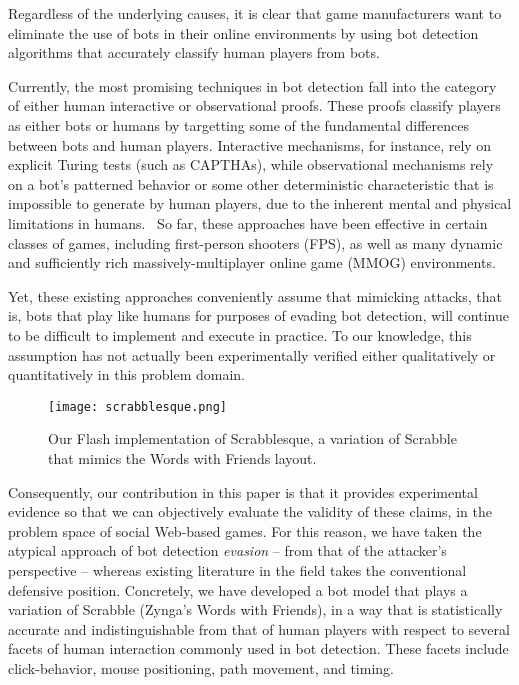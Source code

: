 \documentclass{acm_proc_article-sp}
\begin{document}
Regardless of the underlying causes, it is clear that game manufacturers want to eliminate the use of bots in their online environments by using bot detection algorithms that accurately classify human players from bots.

Currently, the most promising techniques in bot detection fall into the category of either human interactive or observational proofs. These proofs classify players as either bots or humans by targetting some of the fundamental differences between bots and human players. Interactive mechanisms, for instance, rely on explicit Turing tests (such as CAPTHAs), while observational mechanisms rely on a bot's patterned behavior or some other deterministic characteristic that is impossible to generate by human players, due to the inherent mental and physical limitations in humans.~\cite{preventbotitem} So far, these approaches have been effective in certain classes of games, including first-person shooters (FPS), as well as many dynamic and sufficiently rich massively-multiplayer online game (MMOG) environments.

Yet, these existing approaches conveniently assume that mimicking attacks, that is, bots that play like humans for purposes of evading bot detection, will continue to be difficult to implement and execute in practice. To our knowledge, this assumption has not actually been experimentally verified either qualitatively or quantitatively in this problem domain.

\begin{figure}
\centering
\texttt{[image: scrabblesque.png]}
\caption{Our Flash implementation of Scrabblesque, a variation of Scrabble that mimics the Words with Friends layout.}
\end{figure}

Consequently, our contribution in this paper is that it provides experimental evidence so that we can objectively evaluate the validity of these claims, in the problem space of social Web-based games. For this reason, we have taken the atypical approach of bot detection \textit{evasion} -- from that of the attacker's perspective -- whereas existing literature in the field takes the conventional defensive position. Concretely, we have developed a bot model that plays a variation of Scrabble (Zynga's Words with Friends), in a way that is statistically accurate and indistinguishable from that of human players with respect to several facets of human interaction commonly used in bot detection. These facets include click-behavior, mouse positioning, path movement, and timing.
\end{document}
